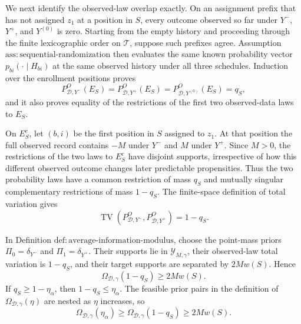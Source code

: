We next identify the observed-law overlap exactly.  On an assignment prefix that has not assigned \(z_1\) at a position in \(S\), every outcome observed so far under \(Y^-\), \(Y^+\), and \(Y^{(0)}\) is zero.  Starting from the empty history and proceeding through the finite lexicographic order on \(\mathcal T\), suppose such prefixes agree.  Assumption \(\mathrm{ass:sequential\text{-}randomization}\) then evaluates the same known probability vector \(p_{bi}(\cdot\mid H_{bi})\) at the same observed history under all three schedules.  Induction over the enrollment positions proves
\[
 P^O_{\mathcal D,Y^-}(E_S)
 =P^O_{\mathcal D,Y^+}(E_S)
 =P^O_{\mathcal D,Y^{(0)}}(E_S)=q_S,
\]
and it also proves equality of the restrictions of the first two observed-data laws to \(E_S\).

On \(E_S^c\), let \((b,i)\) be the first position in \(S\) assigned to \(z_1\).  At that position the full observed record contains \(-M\) under \(Y^-\) and \(M\) under \(Y^+\).  Since \(M>0\), the restrictions of the two laws to \(E_S^c\) have disjoint supports, irrespective of how this different observed outcome changes later predictable propensities.  Thus the two probability laws have a common restriction of mass \(q_S\) and mutually singular complementary restrictions of mass \(1-q_S\).  The finite-space definition of total variation gives
\[
 \operatorname{TV}\!\left(P^O_{\mathcal D,Y^-},P^O_{\mathcal D,Y^+}\right)=1-q_S.
\]

In Definition \(\mathrm{def:average\text{-}information\text{-}modulus}\), choose the point-mass priors \(\Pi_0=\delta_{Y^-}\) and \(\Pi_1=\delta_{Y^+}\).  Their supports lie in \(\mathcal Y_{M,\gamma}\), their observed-law total variation is \(1-q_S\), and their target supports are separated by \(2Mw(S)\).  Hence
\[
 \Omega_{\mathcal D,\gamma}(1-q_S)\ge2Mw(S).
\]
If \(q_S\ge1-\eta_\alpha\), then \(1-q_S\le\eta_\alpha\).  The feasible prior pairs in the definition of \(\Omega_{\mathcal D,\gamma}(\eta)\) are nested as \(\eta\) increases, so
\[
 \Omega_{\mathcal D,\gamma}(\eta_\alpha)
 \ge\Omega_{\mathcal D,\gamma}(1-q_S)
 \ge2Mw(S).
\]

